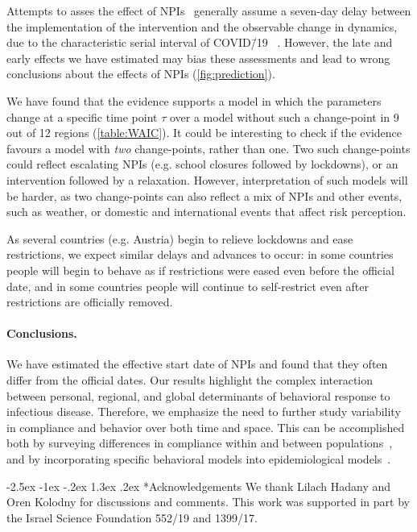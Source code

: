 \documentclass[12pt]{extarticle}
\makeatletter
\renewcommand\section{\@startsection {section}{1}{\z@}%
     {-2.5ex \@plus -1ex \@minus -.2ex}%
     {1.3ex \@plus.2ex}%
    {\Large\bfseries}}
\newcommand{\covid}{COVID\=/19 }
\makeatother
\begin{document}
Attempts to asses the effect of NPIs~\citep{Flaxman2020,Banholzer2020} generally assume a seven-day delay between the implementation of the intervention and the observable change in dynamics, due to the characteristic serial interval of \covid~\citep{Gatto2020}.
However, the late and early effects we have estimated may bias these assessments and lead to wrong conclusions about the effects of NPIs (\autoref{fig:prediction}).

We have found that the evidence supports a model in which the parameters change at a specific time point $\tau$ over a model without such a change-point in 9 out of 12 regions (\autoref{table:WAIC}).
It could be interesting to check if the evidence favours a model with \emph{two} change-points, rather than one. 
Two such change-points could reflect escalating NPIs (e.g. school closures followed by lockdowns), or an intervention followed by a relaxation.
However, interpretation of such models will be harder, as two change-points can also reflect a mix of NPIs and other events, such as weather, or domestic and international events that affect risk perception.

As several countries (e.g. Austria) begin to relieve lockdowns and ease restrictions, we expect similar delays and advances to occur: in some countries people will begin to behave as if restrictions were eased even before the official date, and in some countries people will continue to self-restrict even after restrictions are officially removed.

\paragraph*{Conclusions.}
We have estimated the effective start date of NPIs and found that they often differ from the official dates.
Our results highlight the complex interaction between personal, regional, and global determinants of behavioral response to infectious disease.
Therefore, we emphasize the need to further study variability in compliance and behavior over both time and space. This can be accomplished both by surveying differences in compliance within and between populations~\citep{Atchison2020}, and by incorporating specific behavioral models into epidemiological models~\citep{Fenichela2011,Walters2013,Arthur2020}.

{\small
\section*{Acknowledgements}
We thank Lilach Hadany and Oren Kolodny for discussions and comments.
This work was supported in part by the Israel Science Foundation 552/19 and 1399/17.
}
\end{document}
